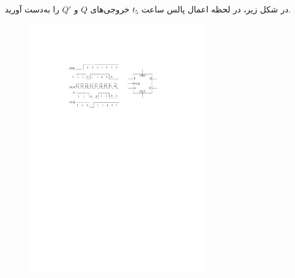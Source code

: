 
در شکل زیر، در لحظه اعمال پالس ساعت $t_5 $ خروجی‌های $Q$ و $Q'$ را به‌دست آورید.

\begin{figure}[h]
	\centering
	\includegraphics[width=0.7\textwidth]{fig/Q_basic6.pdf}
	\label{fig:Q_basic_6}
\end{figure}